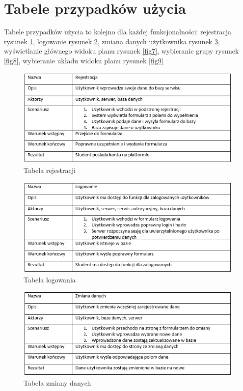 \documentclass[a4paper,11pt]{uzreport}
\begin{document}
\section{Tabele przypadków użycia}
    Tabele przypadków użycia to kolejno dla każdej funkcjonalności: rejestracja rysunek \ref{fig4}, logowanie rysunek \ref{fig5}, zmiana danych użytkownika rysunek \ref{fig6}, wyświetlanie głównego widoku planu rysunek \ref{fig7}, wybieranie grupy rysunek \ref{fig8}, wybieranie układu widoku planu rysunek \ref{fig9}
    \begin{figure}[ht!]
        \centering
        \includegraphics[width=6in]{pictures/rejestracja.PNG}
        \caption{Tabela rejestracji}
        \label{fig4}
     \end{figure}
     \begin{figure}[ht!]
        \centering
        \includegraphics[width=6in]{pictures/logowanie.PNG}
        \caption{Tabela logowania}
        \label{fig5}
     \end{figure}
     \begin{figure}[ht!]
        \centering
        \includegraphics[width=6in]{pictures/zmiana danych.PNG}
        \caption{Tabela zmiany danych}
        \label{fig6}
     \end{figure}
\end{document}
